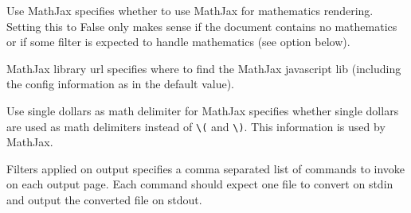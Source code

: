 \begin{configuration}{Use MathJax}
specifies whether to use MathJax for mathematics rendering. Setting this
to False only makes sense if the document contains no mathematics or if
some filter is expected to handle mathematics (see
 option below).
\end{configuration}

\begin{configuration}{MathJax library url}
specifies where to find the MathJax javascript lib (including the config
information as in the default value).
\end{configuration}

\begin{configuration}{Use single dollars as math delimiter for MathJax}
specifies whether single dollars are used as math delimiters instead of
\verb+\(+ and \verb+\)+. This information is used by MathJax.
\end{configuration}


\begin{configuration}{Filters applied on output}
specifies a comma separated list of commands to invoke on each output
page. Each command should expect one file to convert on stdin and output
the converted file on stdout.
\end{configuration}



